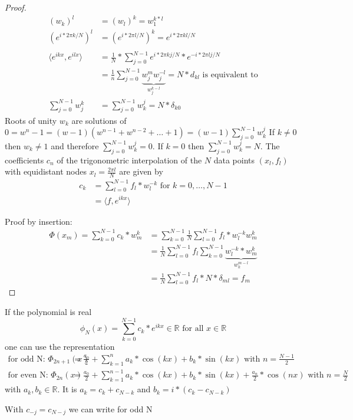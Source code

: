 \begin{proof}
    \begin{align*}
    (w_k)
        ^l &= (w_l)^k = w_1^{k*l}\\
        \left( e^{i*2 \pi k / N} \right)^l &= \left( e^{i*2 \pi l / N} \right)^k = e^{i*2 \pi kl / N}\\
        \\
        \langle e^{ikx}, e^{ilx} \rangle &= \frac{1}{N} * \sum_{j=0}^{N-1} e^{i*2 \pi k j / N} * e^{-i*2 \pi l j / N}\\
        &= \frac{1}{n} \sum_{j=0}^{N-1} \underbrace{w_j^m w_j^{-l}}_{w_j^{k-l}} = N * d_{kl} \text{ is equivalent to}\\
        \sum_{j=0}^{N-1}w_j^k &= \sum_{j=0}^{N-1} w_k^{j} = N * \delta_{k0}
    \end{align*}
    Roots of unity $w_k$ are solutions of $0 = w^n-1 = (w-1)(w^{n-1}+w^{n-2}+\ldots+1) = (w-1) \sum_{j=0}^{N-1} w_k^j$
    If $k \neq 0$ then $w_k \neq 1$ and therefore $\sum_{j=0}^{N-1} w_k^j = 0$.
    If $k=0$ then $\sum_{j=0}^{N-1} w_k^j = N$.
    The coefficients $c_n$ of the trigonometric interpolation of the $N$ data points $(x_l, f_l)$ with equidistant nodes $x_l = \frac{2 \pi l}{N}$ are given by
    \begin{align*}
        c_k &= \sum_{l=0}^{N-1} f_l * w_l^{-k} \text{ for } k = 0, \ldots, N-1\\
        &= \langle f, e^{ikx} \rangle
    \end{align*}

    Proof by insertion:
    \begin{align*}
        \Phi(x_m)=\sum_{k=0}^{N-1} c_k *w_m^k &= \sum_{k=0}^{N-1} \frac{1}{N} \sum_{l=0}^{N-1} f_l * w_l^{-k} w_m^k\\
        &= \frac{1}{N} \sum_{l=0}^{N-1} f_l \sum_{k=0}^{N-1} \underbrace{w_l^{-k}*w_m^k}_{w_k^{m-l}}\\
        &= \frac{1}{N} \sum_{l=0}^{N-1} f_l * N * \delta_{ml} = f_m
    \end{align*}
\end{proof}
\begin{remark}
    If the polynomial is real
    \begin{equation*}
        \phi_N(x) = \sum_{k=0}^{N-1}c_{k}*e^{ikx} \in \mathbb{R} \text{ for all } x \in \mathbb{R}
    \end{equation*}
    one can use the representation
    \begin{align*}
        \text{for odd N: }\Phi_{2n+1}(x) &= \frac{a_0}{2}+\sum_{k=1}^{n} a_k * \cos(kx) + b_k * \sin(kx) \text{ with } n = \frac{N-1}{2}\\
        \text{for even N: } \Phi_{2n}(x) &= \frac{a_0}{2}+\sum_{k=1}^{n-1} a_k * \cos(kx) + b_k * \sin(kx) + \frac{a_n}{2} * \cos(nx) \text{ with } n = \frac{N}{2}
    \end{align*}
    with $a_k, b_k \in \mathbb{R}$.
    It is $a_k = c_k + c_{N-k}$ and $b_k = i *(c_k-c_{N-k})$
\end{remark}
\begin{remark}
    With $c_{-j} = c_{N-j}$ we can write for odd N
\end{remark}

